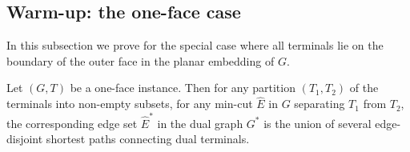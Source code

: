 \subsection{Warm-up: the one-face case}
\label{sec: 1-face}

In this subsection we prove  for the special case where all terminals lie on the boundary of the outer face in the planar embedding of $G$.



\begin{lemma}
	\label{lem: mincut structure}
Let $(G,T)$ be a one-face instance. Then for any partition $(T_1,T_2)$ of the terminals into non-empty subsets, for any min-cut $\hat E$ in $G$ separating $T_1$ from $T_2$, the corresponding edge set $\hat E^*$ in the dual graph $G^*$ is the union of several edge-disjoint shortest paths connecting dual terminals.
\end{lemma}

